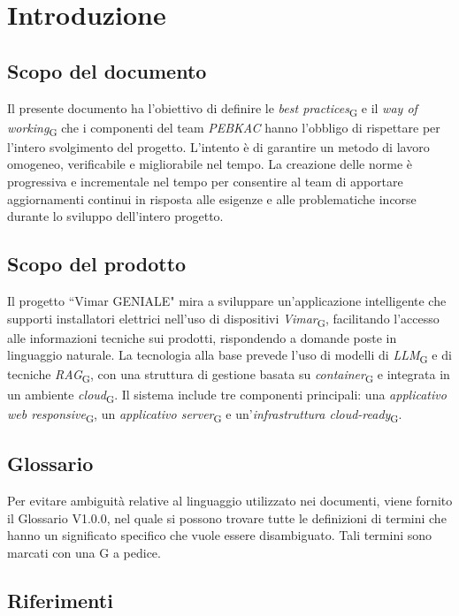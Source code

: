 \section{Introduzione}
\subsection{Scopo del documento}
Il presente documento ha l’obiettivo di definire le \textit{best practices}\textsubscript{G}  e il \textit{way of working}\textsubscript{G} che i componenti del team \textit{PEBKAC} hanno l’obbligo di rispettare per l’intero svolgimento del progetto. L'intento è di garantire un metodo di lavoro omogeneo, verificabile
e migliorabile nel tempo. La creazione delle norme è progressiva e incrementale nel tempo per consentire al team di apportare aggiornamenti continui in risposta alle esigenze e alle problematiche incorse durante lo sviluppo dell'intero progetto.

\subsection{Scopo del prodotto}
Il progetto ``Vimar GENIALE" mira a sviluppare un'applicazione intelligente che supporti installatori elettrici nell'uso di dispositivi \textit{Vimar}\textsubscript{G}, facilitando l'accesso alle informazioni tecniche sui prodotti, rispondendo a domande poste in linguaggio naturale.
La tecnologia alla base prevede l'uso di modelli di \textit{LLM}\textsubscript{G} e di tecniche \textit{RAG}\textsubscript{G}, con una struttura di gestione basata su \textit{container}\textsubscript{G} e integrata in un ambiente \textit{cloud}\textsubscript{G}.
Il sistema include tre componenti principali: una \textit{applicativo web responsive}\textsubscript{G}, un \textit{applicativo server}\textsubscript{G} e un'\textit{infrastruttura cloud-ready}\textsubscript{G}. 
\subsection{Glossario}
Per evitare ambiguità relative al linguaggio utilizzato nei documenti, viene fornito il Glossario V1.0.0, nel quale si possono trovare tutte le definizioni di termini che hanno un significato specifico che vuole essere disambiguato. Tali termini sono marcati con una G a pedice. 
\subsection{Riferimenti}
